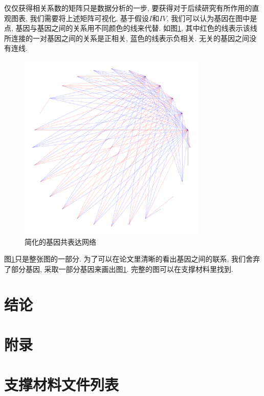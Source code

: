 \documentclass[zihao=-4]{ctexart}
\begin{document}
仅仅获得相关系数的矩阵只是数据分析的一步, 要获得对于后续研究有所作用的直观图表, 我们需要将上述矩阵可视化. 基于假设$I$和$IV$, 我们可以认为基因在图中是点, 基因与基因之间的关系用不同颜色的线来代替. 如图\ref{1}, 其中红色的线表示该线所连接的一对基因之间的关系是正相关, 蓝色的线表示负相关. 无关的基因之间没有连线.
\begin{figure}[H]
    \centering
    \caption{简化的基因共表达网络}
    \label{1}
    \includegraphics[width=0.8\textwidth]{pic/plot100.png}
\end{figure}

图\ref{1}只是整张图的一部分. 为了可以在论文里清晰的看出基因之间的联系, 我们舍弃了部分基因, 采取一部分基因来画出图\ref{1}. 完整的图可以在支撑材料里找到.

\newpage
\section*{结论}


\newpage
\section*{附录}



\section*{支撑材料文件列表}
\end{document}
